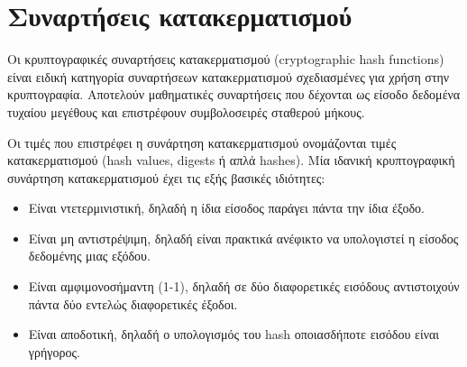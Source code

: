 \section{Συναρτήσεις κατακερματισμού}

Οι κρυπτογραφικές συναρτήσεις κατακερματισμού (cryptographic hash functions) είναι ειδική κατηγορία συναρτήσεων κατακερματισμού σχεδιασμένες για χρήση στην κρυπτογραφία. Αποτελούν μαθηματικές συναρτήσεις που δέχονται ως είσοδο δεδομένα τυχαίου μεγέθους και επιστρέφουν συμβολοσειρές σταθερού μήκους.


Οι τιμές που επιστρέφει η συνάρτηση κατακερματισμού ονομάζονται τιμές κατακερματισμού (hash values, digests ή απλά hashes). Μία ιδανική κρυπτογραφική συνάρτηση κατακερματισμού έχει τις εξής βασικές ιδιότητες:

\begin{itemize}
	\item Είναι ντετερμινιστική, δηλαδή η ίδια είσοδος παράγει πάντα την ίδια έξοδο.
	\item Είναι μη αντιστρέψιμη, δηλαδή είναι πρακτικά ανέφικτο να υπολογιστεί η είσοδος δεδομένης μιας εξόδου.
	\item Είναι αμφιμονοσήμαντη (1-1), δηλαδή σε δύο διαφορετικές εισόδους αντιστοιχούν πάντα δύο εντελώς διαφορετικές έξοδοι.
	\item Είναι αποδοτική, δηλαδή ο υπολογισμός του hash οποιασδήποτε εισόδου είναι γρήγορος.
\end{itemize}

